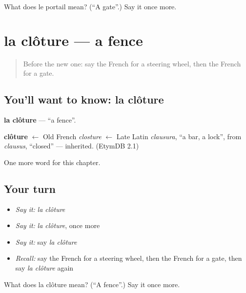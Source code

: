 \begin{tcolorbox}[breakable,colback=teal!4,colframe=teal!35!black,title={Before you move on}]
What does le portail mean? (\textquotedblleft{}A gate\textquotedblright{}.) Say it once more.
\end{tcolorbox}
\section[la clôture]{la clôture — a fence}

\label{lesson:FR-C200-cloture}



\begin{quote}
Before the new one: say the French for a steering wheel, then the French for a gate.
\end{quote}

\subsection*{You'll want to know: la clôture}
\textbf{la clôture} — \textquotedblleft{}a fence\textquotedblright{}.

\begin{cousinweb}
\textbf{clôture} $\leftarrow$ Old French \emph{closture} $\leftarrow$ Late Latin \emph{clausura}, \textquotedblleft{}a bar, a lock\textquotedblright{}, from \emph{clausus}, \textquotedblleft{}closed\textquotedblright{} — inherited. (EtymDB 2.1)
\end{cousinweb}

\begin{grammarlens}[title={What you've built}]
One more word for this chapter.
\end{grammarlens}

\subsection*{Your turn}
\begin{itemize}
\raggedright
  \item \emph{Say it:} \emph{la clôture}
  \item \emph{Say it:} \emph{la clôture}, once more
  \item \emph{Say it:} say \emph{la clôture}
  \item \emph{Recall:} say the French for a steering wheel, then the French for a gate, then say \emph{la clôture} again
\end{itemize}

\begin{tcolorbox}[breakable,colback=teal!4,colframe=teal!35!black,title={Before you move on}]
What does la clôture mean? (\textquotedblleft{}A fence\textquotedblright{}.) Say it once more.
\end{tcolorbox}
